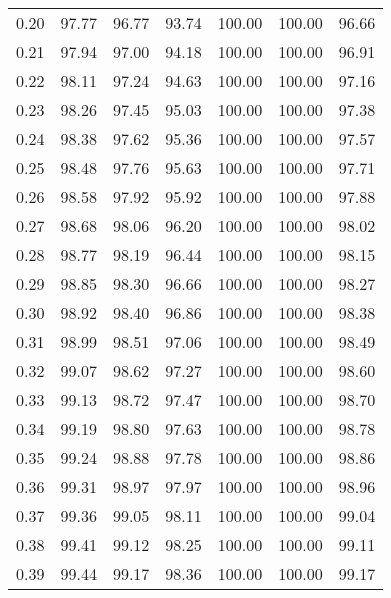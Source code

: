 \begin{tabular}{|c|c|c|c|c|c|c|}
      0.20 &     97.77 &     96.77 &      93.74 &  100.00 &     100.00 &         96.66 \\
      0.21 &     97.94 &     97.00 &      94.18 &  100.00 &     100.00 &         96.91 \\
      0.22 &     98.11 &     97.24 &      94.63 &  100.00 &     100.00 &         97.16 \\
      0.23 &     98.26 &     97.45 &      95.03 &  100.00 &     100.00 &         97.38 \\
      0.24 &     98.38 &     97.62 &      95.36 &  100.00 &     100.00 &         97.57 \\
      0.25 &     98.48 &     97.76 &      95.63 &  100.00 &     100.00 &         97.71 \\
      0.26 &     98.58 &     97.92 &      95.92 &  100.00 &     100.00 &         97.88 \\
      0.27 &     98.68 &     98.06 &      96.20 &  100.00 &     100.00 &         98.02 \\
      0.28 &     98.77 &     98.19 &      96.44 &  100.00 &     100.00 &         98.15 \\
      0.29 &     98.85 &     98.30 &      96.66 &  100.00 &     100.00 &         98.27 \\
      0.30 &     98.92 &     98.40 &      96.86 &  100.00 &     100.00 &         98.38 \\
      0.31 &     98.99 &     98.51 &      97.06 &  100.00 &     100.00 &         98.49 \\
      0.32 &     99.07 &     98.62 &      97.27 &  100.00 &     100.00 &         98.60 \\
      0.33 &     99.13 &     98.72 &      97.47 &  100.00 &     100.00 &         98.70 \\
      0.34 &     99.19 &     98.80 &      97.63 &  100.00 &     100.00 &         98.78 \\
      0.35 &     99.24 &     98.88 &      97.78 &  100.00 &     100.00 &         98.86 \\
      0.36 &     99.31 &     98.97 &      97.97 &  100.00 &     100.00 &         98.96 \\
      0.37 &     99.36 &     99.05 &      98.11 &  100.00 &     100.00 &         99.04 \\
      0.38 &     99.41 &     99.12 &      98.25 &  100.00 &     100.00 &         99.11 \\
      0.39 &     99.44 &     99.17 &      98.36 &  100.00 &     100.00 &         99.17 \\

\end{tabular}

